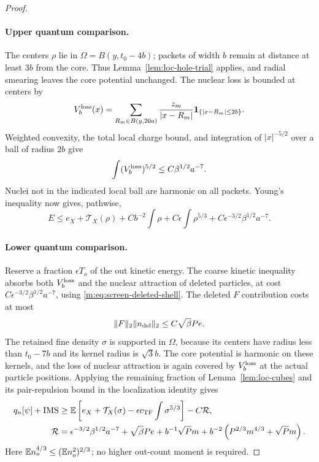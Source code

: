 \begin{proof}
\paragraph{Upper quantum comparison.}
The centers $\rho$ lie in $\Omega=B(y,t_0-4b)$; packets of width
$b$ remain at distance at least $3b$ from the core.  Thus
Lemma~\ref{lem:loc-hole-trial} applies, and radial smearing leaves
the core potential unchanged.  The nuclear loss is bounded at
centers by
\[
 V_b^{\rm loss}(x)=\sum_{R_m\in B(y,20a)}
             \frac{z_m}{|x-R_m|}\mathbf 1_{\{|x-R_m|\le2b\}}.
\]
Weighted convexity, the total local charge bound, and integration of
$|x|^{-5/2}$ over a ball of radius $2b$ give
\[
 \int(V_b^{\rm loss})^{5/2}\le C\beta^{1/2}a^{-7}.
\]
Nuclei not in the indicated local ball are harmonic on all packets.
Young's inequality now gives, pathwise,
\begin{equation}\label{m:eq:screen-patch-upper}
 E\le e_X+\mathcal T_X(\rho)+Cb^{-2}\int\rho
       +C\epsilon\int\rho^{5/3}
       +C\epsilon^{-3/2}\beta^{1/2}a^{-7}.
\end{equation}

\paragraph{Lower quantum comparison.}
Reserve a fraction $\epsilon T_o$ of the out kinetic energy.  The
coarse kinetic inequality absorbs both $V_b^{\rm loss}$ and the
nuclear attraction of deleted particles, at cost
$C\epsilon^{-3/2}\beta^{1/2}a^{-7}$, using
\eqref{m:eq:screen-deleted-shell}.  The deleted $F$ contribution costs
at most
\[
 \|F\|_2\|n_{\rm del}\|_2\le C\sqrt\beta Pe.
\]
The retained fine density $\sigma$ is supported in $\Omega$, because
its centers have radius less than $t_0-7b$ and its kernel radius is
$\sqrt3b$.  The core potential is harmonic on these kernels, and
the loss of nuclear attraction is again covered by $V_b^{\rm loss}$
at the actual particle positions.  Applying the remaining fraction
of Lemma~\ref{lem:loc-cubes} and its pair-repulsion bound in the
localization identity gives
\begin{align}\label{m:eq:screen-patch-lower}
 q_n[\psi]+\mathrm{IMS}
 &\ge\mathbb E\left[e_X+\mathcal T_X(\sigma)
                    -\epsilon c_{\mathrm{TF}}\int\sigma^{5/3}\right]
       -C\mathcal R,\\
 \mathcal R&=\epsilon^{-3/2}\beta^{1/2}a^{-7}
             +\sqrt\beta Pe+b^{-1}\sqrt Pm
             +b^{-2}\left(P^{2/3}m^{4/3}+\sqrt Pm\right).\notag
\end{align}
Here $\mathbb E n_o^{4/3}\le(\mathbb E n_o^2)^{2/3}$; no higher out-count
moment is required.


\end{proof}
